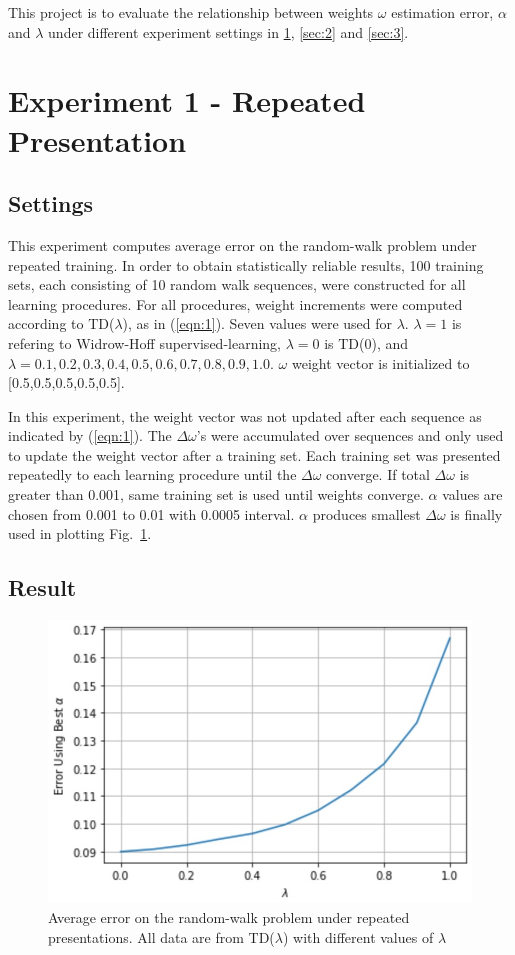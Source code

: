 \documentclass[conference]{IEEEtran}
\begin{document}
This project is to evaluate the relationship between weights $\omega$ estimation error, $\alpha$ and $\lambda$ under different experiment settings in \ref{sec:1}, \ref{sec:2} and \ref{sec:3}.

\section{Experiment 1 - Repeated Presentation}\label{sec:1}

\subsection{Settings}
This experiment computes average error on the random-walk problem under repeated training. In order to obtain statistically reliable results, 100 training sets, each consisting of 10 random walk sequences, were constructed for all learning procedures. For all procedures, weight increments were computed according to TD($\lambda$), as in (\ref{eqn:1}). Seven values were used for $\lambda$. $\lambda = 1$ is refering to Widrow-Hoff supervised-learning, $\lambda = 0$ is TD(0), and $\lambda = 0.1, 0.2, 0.3, 0.4, 0.5, 0.6, 0.7, 0.8, 0.9, 1.0$. $\omega$ weight vector is initialized to [0.5,0.5,0.5,0.5,0.5].

In this experiment, the weight vector was not updated after each sequence as indicated by (\ref{eqn:1}). The $\Delta \omega$'s were accumulated over sequences and only used to update the weight vector after a training set. Each training set was presented repeatedly to each learning procedure until the $\Delta\omega$ converge. If total $\Delta\omega$ is greater than 0.001, same training set is used until weights converge. $\alpha$ values are chosen from 0.001 to 0.01 with 0.0005 interval. $\alpha$ produces smallest $\Delta\omega$ is finally used in plotting Fig.~\ref{fig2}.

\subsection{Result}

\begin{figure}[htbp]
\includegraphics[width=\linewidth]{output1.png}
\caption{Average error on the random-walk problem under repeated presentations. All data are from TD($\lambda$) with different values of $\lambda$}
\label{fig2}
\end{figure}
\end{document}
